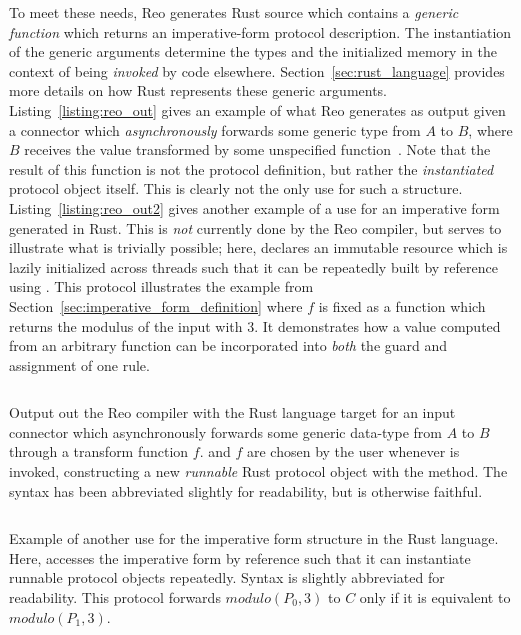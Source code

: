 To meet these needs, Reo generates Rust source which contains a \textit{generic function} which returns an imperative-form protocol description. The instantiation of the generic arguments determine the types and the initialized memory in the context of being \textit{invoked} by code elsewhere. Section~\ref{sec:rust_language} provides more details on how Rust represents these generic arguments. Listing~\ref{listing:reo_out} gives an example of what Reo generates as output given a connector which \textit{asynchronously} forwards some generic type  from $A$ to $B$, where $B$ receives the value transformed by some unspecified function~. Note that the result of this function is not the protocol definition, but rather the \textit{instantiated} protocol object itself. This is clearly not the only use for such a structure. Listing~\ref{listing:reo_out2} gives another example of a use for an imperative form generated in Rust. This is \textit{not} currently done by the Reo compiler, but serves to illustrate what is trivially possible; here,  declares an immutable resource which is lazily initialized across threads such that it can be repeatedly built by reference using . This protocol illustrates the example from Section~\ref{sec:imperative_form_definition} where $f$ is fixed as a function which returns the modulus of the input with 3. It demonstrates how a value computed from an arbitrary function can be incorporated into \textit{both} the guard and assignment of one rule.


\begin{listing}[ht]
	\centering
	\inputminted{rust}{reo_out.rs}
	\caption[Example of Reo compiler output to imperative form in Rust.]{Output out the Reo compiler with the Rust language target for an input connector which asynchronously forwards some generic data-type  from $A$ to $B$ through a transform function $f$.  and $f$ are chosen by the user whenever  is invoked, constructing a new  \textit{runnable} Rust protocol object with the  method. The syntax has been abbreviated slightly for readability, but is otherwise faithful.}
	\label{listing:reo_out}
\end{listing}

\begin{listing}[ht]
\centering
\inputminted{rust}{reo_out2.rs}
\caption[TODO]{Example of another use for the imperative form structure in the Rust language. Here,  accesses the imperative form by reference such that it can instantiate runnable protocol objects repeatedly. Syntax is slightly abbreviated for readability. This protocol forwards $modulo(P_0,3)$ to $C$ only if it is equivalent to $modulo(P_1,3)$.}
\label{listing:reo_out2}
\end{listing}


